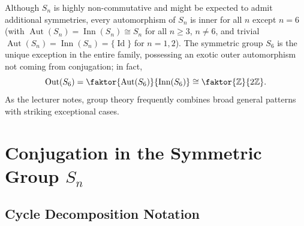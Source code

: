 \begin{insight}
Although $S_n$ is highly non-commutative and might be expected to admit additional symmetries, every automorphism of $S_n$ is inner for all $n$ except $n = 6$ (with $\operatorname{Aut}(S_n) = \operatorname{Inn}(S_n) \cong S_n$ for all $n \ge 3$, $n \neq 6$, and trivial $\operatorname{Aut}(S_n) = \operatorname{Inn}(S_n) = \{\operatorname{Id}\}$ for $n = 1, 2$). The symmetric group $S_6$ is the unique exception in the entire family, possessing an exotic outer automorphism not coming from conjugation; in fact,
\[
\operatorname{Out}(S_6) = \faktor{\operatorname{Aut}(S_6)}{\operatorname{Inn}(S_6)} \cong \faktor{\mathbb{Z}}{2\mathbb{Z}}.
\]
As the lecturer notes, group theory frequently combines broad general patterns with striking exceptional cases.
\end{insight}

\begin{hidden}
\end{hidden}

\section{Conjugation in the Symmetric Group \texorpdfstring{$S_n$}{S\_n}}

\subsection{Cycle Decomposition Notation}

